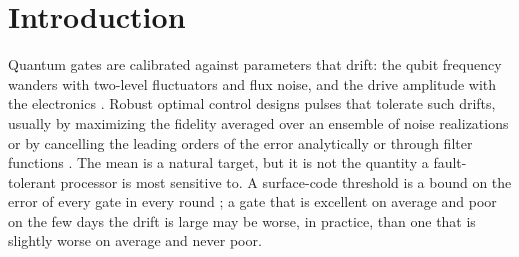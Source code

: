 \documentclass[aps,pra,twocolumn,superscriptaddress,reprint,nofootinbib,floatfix]{revtex4-2}
\theoremstyle{definition}
\begin{document}
\begin{abstract}
single-channel ratio 5.58 and the two-channel ratio 4.00, and that predicts
each control's ratio from its geometry to 3\%. Rotating the noise between two
channels raises that number by a mechanism with no time structure, and the
residuals from the two routes are statistically indistinguishable. Finally,
adding trajectory-level $T_1$ relaxation gives a rare catastrophic channel
whose effect on the tail-to-mean ratio we predict in closed form to 1\% across
a factor of 640 in its share of the mean loss --- and which nonetheless leaves
the selected pulse unchanged, because the gate requirement pins the channel to
within a percent whatever the objective. Tail weight without control leverage
buys nothing, a condition that $\kappa$ does not see.
\end{abstract}

\maketitle

\section{Introduction}
\label{sec:intro}

Quantum gates are calibrated against parameters that drift: the qubit
frequency wanders with two-level fluctuators and flux noise, and the drive
amplitude with the electronics \cite{Paladino2014,Krantz2019,Kjaergaard2020}.
Robust optimal control designs pulses that tolerate such drifts, usually by
maximizing the fidelity averaged over an ensemble of noise realizations
\cite{Khaneja2005,Glaser2015,Chen2014,Kosut2013,Weidner2025} or by cancelling
the leading orders of the error analytically or through filter functions
\cite{Wimperis1994,Green2013,Poggi2024,Ball2021}. The mean is a natural
target, but it is not the quantity a fault-tolerant processor is most
sensitive to. A surface-code threshold is a bound on the error of every
gate in every round \cite{Fowler2012}; a gate that is excellent on average
and poor on the few days the drift is large may be worse, in practice, than
one that is slightly worse on average and never poor.
\end{document}

